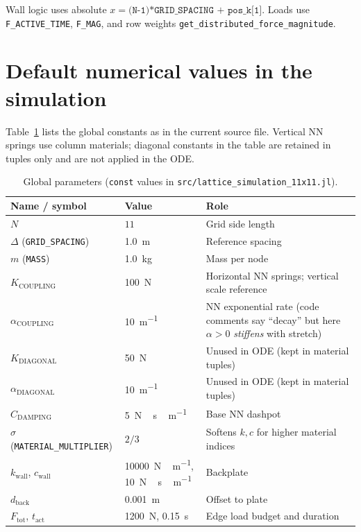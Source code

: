 \documentclass[11pt,a4paper]{article}
\begin{document}
\begin{codebox}
Wall logic uses absolute $x = \texttt{(N-1)*GRID\_SPACING + pos\_k[1]}$. Loads use \texttt{F\_ACTIVE\_TIME}, \texttt{F\_MAG}, and row weights \texttt{get\_distributed\_force\_magnitude}.
\end{codebox}

\section{Default numerical values in the simulation}
\label{sec:constants}

Table~\ref{tab:constants} lists the global constants as in the current source file. Vertical NN springs use column materials; diagonal constants in the table are retained in tuples only and are not applied in the ODE.

\begin{table}[htbp]
\centering
\small
\begin{tabular}{@{}p{}p{}p{}@{}}
\toprule
\textbf{Name / symbol} & \textbf{Value} & \textbf{Role} \\
\midrule
$N$ & $11$ & Grid side length \\
$\Delta$ (\texttt{GRID\_SPACING}) & \SI{1.0}{m} & Reference spacing \\
$m$ (\texttt{MASS}) & \SI{1.0}{kg} & Mass per node \\
$K_{\text{COUPLING}}$ & \SI{100}{N} & Horizontal NN springs; vertical scale reference \\
$\alpha_{\text{COUPLING}}$ & \SI{10}{m^{-1}} & NN exponential rate (code comments say ``decay'' but here $\alpha>0$ \emph{stiffens} with stretch) \\
$K_{\text{DIAGONAL}}$ & \SI{50}{N} & Unused in ODE (kept in material tuples) \\
$\alpha_{\text{DIAGONAL}}$ & \SI{10}{m^{-1}} & Unused in ODE (kept in material tuples) \\
$C_{\text{DAMPING}}$ & \SI{5}{N\,s\,m^{-1}} & Base NN dashpot \\
$\sigma$ (\texttt{MATERIAL\_MULTIPLIER}) & $2/3$ & Softens $k,c$ for higher material indices \\
$k_{\mathrm{wall}}$, $c_{\mathrm{wall}}$ & \SI{10000}{N\,m^{-1}}, \SI{10}{N\,s\,m^{-1}} & Backplate \\
$d_{\text{back}}$ & \SI{0.001}{m} & Offset to plate \\
$F_{\mathrm{tot}}$, $t_{\mathrm{act}}$ & \SI{1200}{N}, \SI{0.15}{s} & Edge load budget and duration \\
\bottomrule
\end{tabular}
\caption{Global parameters (\texttt{const} values in \texttt{src/lattice\_simulation\_11x11.jl}).}
\label{tab:constants}
\end{table}
\end{document}
